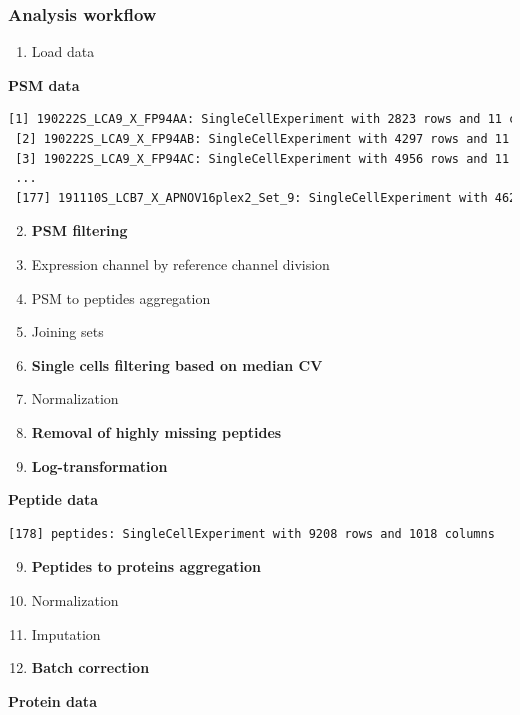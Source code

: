 \documentclass{beamer}
\newcommand{\frametitlesection}[1]{\frametitle{\centering #1 \footnotesize \hspace{0pt plus 1 filll} \insertsection}}
\begin{document}
\begin{frame}[fragile]
    \frametitlesection{Analysis workflow}

    \scriptsize

    \begin{enumerate}
        \item Load data
    \end{enumerate}

    \textbf{PSM data}

    \begin{lstlisting}[language = TeX, numbers = none, basicstyle = \ttfamily\@setfontsize{\srcsize}{5pt}{5pt}\color{vdgray}]
 [1] 190222S_LCA9_X_FP94AA: SingleCellExperiment with 2823 rows and 11 columns
 [2] 190222S_LCA9_X_FP94AB: SingleCellExperiment with 4297 rows and 11 columns
 [3] 190222S_LCA9_X_FP94AC: SingleCellExperiment with 4956 rows and 11 columns
 ...
 [177] 191110S_LCB7_X_APNOV16plex2_Set_9: SingleCellExperiment with 4626 rows and 16 columns
    \end{lstlisting}

    \pause

    \begin{enumerate}
        \setcounter{enumi}{1}
        \item \textbf<4>{PSM filtering}
        \item Expression channel by reference channel division
        \item PSM to peptides aggregation
        \item Joining sets
        \item \textbf<4>{Single cells filtering based on median CV}
        \item Normalization
        \item \textbf<4>{Removal of highly missing peptides}
        \item \textbf<4>{Log-transformation}
    \end{enumerate}

    \textbf{Peptide data}

    \begin{lstlisting}[language = TeX, numbers = none, basicstyle = \ttfamily\@setfontsize{\srcsize}{5pt}{5pt}\color{vdgray}]
 [178] peptides: SingleCellExperiment with 9208 rows and 1018 columns
    \end{lstlisting}

    \pause

    \begin{enumerate}
        \setcounter{enumi}{8}
        \item \textbf<4>{Peptides to proteins aggregation}
        \item Normalization
        \item Imputation
        \item \textbf<4>{Batch correction}
    \end{enumerate}
    \textbf{Protein data}


\end{frame}
\end{document}
